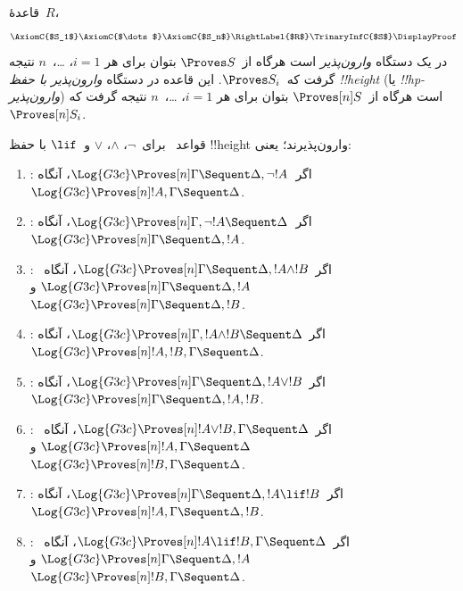 \documentclass[../../../include/open-logic-section]{subfiles}
\begin{document}


\begin{defn}
قاعدهٔ~$R$،
\[
\AxiomC{$S_1$}
\AxiomC{$\dots$}
\AxiomC{$S_n$}
\RightLabel{$R$}
\TrinaryInfC{$S$}
\DisplayProof
\]
در یک دستگاه \emph{وارون‌پذیر} است هرگاه از~$\Proves S$ بتوان برای هر
$i = 1$، \dots،~$n$ نتیجه گرفت که~$\Proves S_i$. این قاعده در دستگاه
\emph{وارون‌پذیر با حفظ !!{height}} (یا
\emph{!!{hp}-وارون‌پذیر}) است هرگاه از~$\Proves[n] S$ بتوان برای هر
$i = 1$، \dots،~$n$ نتیجه گرفت که~$\Proves[n] S_i$.
\end{defn}

\begin{lem}
قواعد~ برای~$\lnot$، $\land$، $\lor$ و~$\lif$ با حفظ
!!{height} وارون‌پذیرند؛ یعنی:
\begin{enumerate}
  \item \RightR{\lnot}: اگر~$\Log{G3c} \Proves[n] \Gamma \Sequent
  \Delta, \lnot !A$، آنگاه~$\Log{G3c} \Proves[n] !A, \Gamma \Sequent
  \Delta$.
  \item \LeftR{\lnot}: اگر~$\Log{G3c} \Proves[n] \Gamma, \lnot !A
  \Sequent \Delta$، آنگاه~$\Log{G3c} \Proves[n] \Gamma \Sequent \Delta,
  !A$.
  \item \RightR{\land}: اگر~$\Log{G3c} \Proves[n] \Gamma \Sequent
  \Delta, !A \land !B$، آنگاه~$\Log{G3c} \Proves[n] \Gamma \Sequent
  \Delta, !A$ و~$\Log{G3c} \Proves[n] \Gamma \Sequent
  \Delta, !B$.
  \item \LeftR{\land}: اگر~$\Log{G3c} \Proves[n] \Gamma, !A \land !B
  \Sequent \Delta$، آنگاه~$\Log{G3c} \Proves[n] !A, !B, \Gamma \Sequent
  \Delta$.
  \item \RightR{\lor}: اگر~$\Log{G3c} \Proves[n] \Gamma \Sequent
  \Delta, !A \lor !B$، آنگاه~$\Log{G3c} \Proves[n] \Gamma \Sequent
  \Delta, !A, !B$.
  \item \LeftR{\lor}: اگر~$\Log{G3c} \Proves[n] !A \lor !B, \Gamma
  \Sequent \Delta$، آنگاه~$\Log{G3c} \Proves[n] !A, \Gamma \Sequent
  \Delta$ و~$\Log{G3c} \Proves[n] !B, \Gamma \Sequent
  \Delta$.
  \item \RightR{\lif}: اگر~$\Log{G3c} \Proves[n] \Gamma \Sequent
  \Delta, !A \lif !B$، آنگاه~$\Log{G3c} \Proves[n] !A, \Gamma \Sequent
  \Delta, !B$.
  \item \LeftR{\lif}: اگر~$\Log{G3c} \Proves[n] !A \lif !B, \Gamma
  \Sequent \Delta$، آنگاه~$\Log{G3c} \Proves[n] \Gamma \Sequent \Delta,
  !A$ و~$\Log{G3c} \Proves[n] !B, \Gamma \Sequent \Delta$.
\end{enumerate}
\end{lem}
\end{document}
